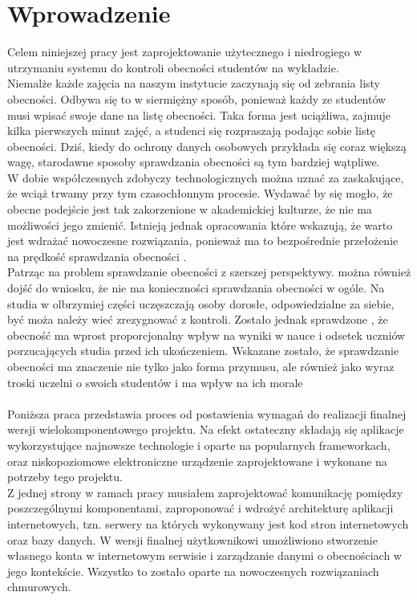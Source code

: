 \documentclass[declaration,shortabstract, mgr]{iithesis}
\author {Dawid Szczyrk}
\begin{document}
\chapter{Wprowadzenie}

Celem niniejszej pracy jest zaprojektowanie użytecznego i niedrogiego w utrzymaniu systemu do kontroli obecności studentów na wykładzie.\\
\indent Niemalże każde zajęcia na naszym instytucie zaczynają się od zebrania listy obecności. Odbywa się to w siermiężny sposób, ponieważ każdy ze studentów musi wpisać swoje dane na listę obecności.
Taka forma jest uciążliwa, zajmuje kilka pierwszych minut zajęć, a studenci się rozpraszają podając sobie listę obecności. Dziś, kiedy do ochrony danych osobowych przykłada się
coraz większą wagę, starodawne sposoby sprawdzania obecności są tym bardziej wątpliwe.\\
\indent W dobie współczesnych zdobyczy technologicznych można uznać za zaskakujące, że wciąż trwamy przy tym czasochłonnym procesie. Wydawać by się mogło, że obecne podejście jest tak zakorzenione w akademickiej kulturze, że nie ma możliwości jego zmienić. Istnieją jednak opracowania które wskazują, że warto jest wdrażać nowoczesne rozwiązania, ponieważ ma to bezpośrednie przełożenie na prędkość sprawdzania obecności \cite{lcd}.\\
\indent Patrząc na problem sprawdzanie obecności z szerszej perspektywy. można również dojść do wniosku, że nie ma konieczności sprawdzania obecności w ogóle. Na studia w olbrzymiej części uczęszczają osoby dorosłe, odpowiedzialne za siebie, być moża należy wieć zrezygnować z kontroli. Zostało jednak sprawdzone \cite{theory_base}, że obecność ma wprost proporcjonalny wpływ na wyniki w nauce i odsetek uczniów porzucających studia przed ich ukończeniem. Wskazane zostało, że sprawdzanie obecności ma znaczenie nie tylko jako forma przymusu, ale również jako wyraz troski uczelni o swoich studentów i ma wpływ na ich morale\\\\
\indent Poniższa praca przedstawia proces od postawienia wymagań do realizacji finalnej wersji wielokomponentowego projektu. Na efekt ostateczny składają się aplikacje wykorzystujące najnowsze technologie i oparte na popularnych frameworkach, oraz niskopoziomowe elektroniczne urządzenie zaprojektowane i wykonane na potrzeby tego projektu.\\
\indent Z jednej strony w ramach pracy musiałem zaprojektować komunikację pomiędzy poszczególnymi komponentami, zaproponować i wdrożyć architekturę aplikacji internetowych, tzn. serwery na których wykonywany jest kod stron internetowych oraz bazy danych. W wersji finalnej użytkownikowi umożliwiono stworzenie własnego konta w internetowym serwisie i zarządzanie danymi o obecnościach w jego kontekście. Wszystko to zostało oparte na nowoczesnych rozwiązaniach chmurowych. \\
\end{document}
